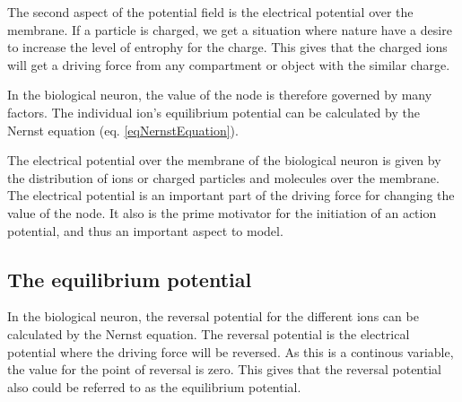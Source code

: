 The second aspect of the potential field is the electrical potential over the membrane. 
If a particle is charged, we get a situation where nature have a desire to increase the level of entrophy for the charge.
This gives that the charged ions will get a driving force from any compartment or object with the similar charge.


In the biological neuron, the value of the node is therefore governed by many factors. 
The individual ion's equilibrium potential can be calculated by the Nernst equation (eq. \ref{eqNernstEquation}).


The electrical potential over the membrane of the biological neuron is given by the distribution of ions or charged particles and molecules over the  membrane.
The electrical potential is an important part of the driving force for changing the value of the node.
It also is the prime motivator for the initiation of an action potential, and thus an important aspect to model.





\subsection{The equilibrium potential}
\label{ssecTheEquilibriumPotential}
In the biological neuron, the reversal potential for the different ions can be calculated by the Nernst equation. 
The reversal potential is the electrical potential where the driving force will be reversed.
As this is a continous variable, the value for the point of reversal is zero. 
This gives that the reversal potential also could be referred to as the equilibrium potential.


